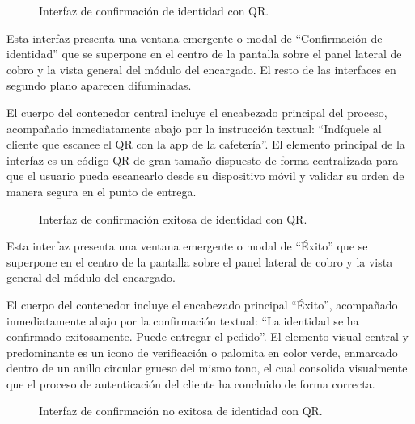 \begin{figure}[H]
    \centering
    
    \caption{Interfaz de confirmación de identidad con QR.}
    \label{fig:ui-ent-05}
\end{figure}

Esta interfaz presenta una ventana emergente o modal de ``Confirmación de identidad'' que se superpone en el centro de la pantalla sobre el panel lateral de cobro y la vista general del módulo del encargado. El resto de las interfaces en segundo plano aparecen difuminadas. 

El cuerpo del contenedor central incluye el encabezado principal del proceso, acompañado inmediatamente abajo por la instrucción textual: ``Indíquele al cliente que escanee el QR con la app de la cafetería''. El elemento principal de la interfaz es un código QR de gran tamaño dispuesto de forma centralizada para que el usuario pueda escanearlo desde su dispositivo móvil y validar su orden de manera segura en el punto de entrega.

\begin{figure}[H]
    \centering
    
    \caption{Interfaz de confirmación exitosa de identidad con QR.}
    \label{fig:ui-ent-06}
\end{figure}

Esta interfaz presenta una ventana emergente o modal de ``Éxito'' que se superpone en el centro de la pantalla sobre el panel lateral de cobro y la vista general del módulo del encargado. 

El cuerpo del contenedor incluye el encabezado principal ``Éxito'', acompañado inmediatamente abajo por la confirmación textual: ``La identidad se ha confirmado exitosamente. Puede entregar el pedido''. El elemento visual central y predominante es un icono de verificación o palomita en color verde, enmarcado dentro de un anillo circular grueso del mismo tono, el cual consolida visualmente que el proceso de autenticación del cliente ha concluido de forma correcta.

\begin{figure}[H]
    \centering
    
    \caption{Interfaz de confirmación no exitosa de identidad con QR.}
    \label{fig:ui-ent-07}
\end{figure}

